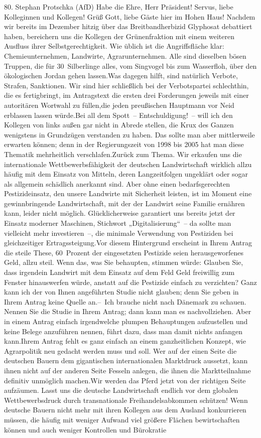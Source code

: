 \documentclass{article}
\begin{document}
	80. Stephan Protschka (AfD) Habe die Ehre, Herr Präsident! Servus, liebe Kolleginnen und Kollegen! Grüß Gott, liebe Gäste hier im Hohen Haus! Nachdem wir bereits im Dezember hitzig über das Breitbandherbizid Glyphosat debattiert haben, bereichern uns die Kollegen der Grünenfraktion mit einem weiteren Ausfluss ihrer Selbstgerechtigkeit. Wie üblich ist die Angriffsfläche klar: Chemieunternehmen, Landwirte, Agrar­unternehmen. Alle sind dieselben bösen Truppen, die für 30 Silberlinge alles, vom Singvogel bis zum Wasserfloh, über den ökologischen Jordan gehen lassen.Was dagegen hilft, sind natürlich Verbote, Strafen, Sanktionen. Wir sind hier schließlich bei der Verbotspartei schlechthin, die es fertigbringt, im Antragstext die ersten drei Forderungen jeweils mit einer autoritären Wortwahl zu füllen,die jeden preußischen Hauptmann vor Neid erblassen lassen würde.Bei all dem Spott – Entschuldigung! – will ich den Kollegen von links außen gar nicht in Abrede stellen, die Krux des Ganzen wenigstens in Grundzügen verstanden zu haben. Das sollte man aber mittlerweile erwarten können; denn in der Regierungszeit von 1998 bis 2005 hat man diese Thematik mehrheitlich verschlafen.Zurück zum Thema. Wir erkaufen uns die internationale Wettbewerbsfähigkeit der deutschen Landwirtschaft wirklich allzu häufig mit dem Einsatz von Mitteln, deren Langzeitfolgen ungeklärt oder sogar als allgemein schädlich anerkannt sind. Aber ohne einen bedarfsgerechten Pestizideinsatz, den unsere Landwirte mit Sicherheit leisten, ist im Moment eine gewinnbringende Landwirtschaft, mit der der Landwirt seine Familie ernähren kann, leider nicht möglich. Glücklicherweise garantiert uns bereits jetzt der Einsatz moderner Maschinen, Stichwort „Digitalisierung“ – da sollte man vielleicht mehr investieren –, die minimale Verwendung von Pestiziden bei gleichzeitiger Ertragssteigung.Vor diesem Hintergrund erscheint in Ihrem Antrag die steile These, 60 Prozent der eingesetzten Pestizide seien herausgeworfenes Geld, allzu steil. Wenn das, was Sie behaupten, stimmen würde: Glauben Sie, dass irgendein Landwirt mit dem Einsatz auf dem Feld Geld freiwillig zum Fenster hinauswerfen würde, anstatt auf die Pestizide einfach zu verzichten? Ganz kann ich der von Ihnen angeführten Studie nicht glauben; denn Sie geben in Ihrem Antrag keine Quelle an.– Ich brauche nicht nach Dänemark zu schauen. Nennen Sie die Studie in Ihrem Antrag; dann kann man es nachvollziehen. Aber in einem Antrag einfach irgendwelche plumpen Behauptungen aufzustellen und keine Belege anzuführen nennen, führt dazu, dass man damit nichts anfangen kann.Ihrem Antrag fehlt es ganz einfach an einem ganzheitlichen Konzept, wie Agrarpolitik neu gedacht werden muss und soll. Wer auf der einen Seite die deutschen Bauern dem gigantischen internationalen Marktdruck aussetzt, kann ihnen nicht auf der anderen Seite Fesseln anlegen, die ihnen die Marktteilnahme definitiv unmöglich machen.Wir werden das Pferd jetzt von der richtigen Seite aufzäumen. Lasst uns die deutsche Landwirtschaft endlich vor dem globalen Wettbewerbsdruck durch transnationale Freihandelsabkommen schützen! Wenn deutsche Bauern nicht mehr mit ihren Kollegen aus dem Ausland konkurrieren müssen, die häufig mit weniger Aufwand viel größere Flächen bewirtschaften können und auch weniger Kontrollen und Bürokratie 
\end{document}
